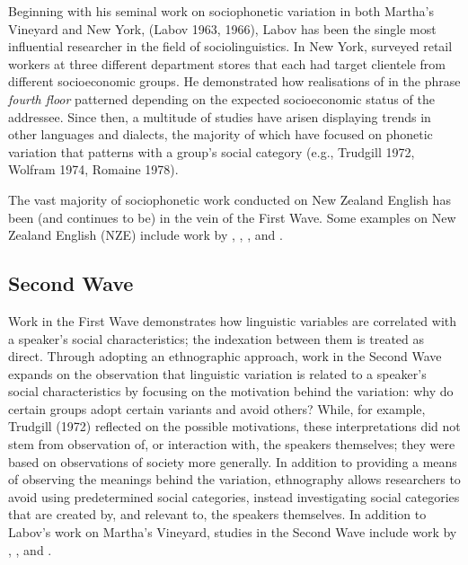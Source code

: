 Beginning with his seminal work on sociophonetic variation in both Martha's Vineyard and New York, (Labov 1963, 1966), Labov has been the single most influential researcher in the field of sociolinguistics. In New York,  surveyed retail workers at three different department stores that each had target clientele from different socioeconomic groups.  He demonstrated how realisations of  in the phrase \textit{fourth floor} patterned depending on the expected socioeconomic status of the addressee.  Since then, a multitude of studies have arisen displaying trends in other languages and dialects, the majority of which have focused on phonetic variation that patterns with a group's social category (e.g., Trudgill 1972, Wolfram 1974, Romaine 1978).  \nocite{trudgill1972,romaine1978,wolfram1974}

The vast majority of sociophonetic work conducted on New Zealand English has been (and continues to be) in the vein of the First Wave.  Some examples on New Zealand English (NZE) include work by , , , and .


\subsection{Second Wave}\label{sec:secondwave}
Work in the First Wave demonstrates how linguistic variables are correlated with a speaker's social characteristics; the indexation between them is treated as direct.  Through adopting an ethnographic approach, work in the Second Wave expands on the observation that linguistic variation is related to a speaker's social characteristics by focusing on the motivation behind the variation: why do certain groups adopt certain variants and avoid others?  While, for example, Trudgill (1972) reflected on the possible motivations, these interpretations did not stem from observation of, or interaction with, the speakers themselves; they were based on observations of society more generally.  In addition to providing a means of observing the meanings behind the variation, ethnography allows researchers to avoid using predetermined social categories, instead investigating social categories that are created by, and relevant to, the speakers themselves.  In addition to Labov's work on Martha's Vineyard, studies in the Second Wave include work by , , and . \nocite{trudgill1972}


